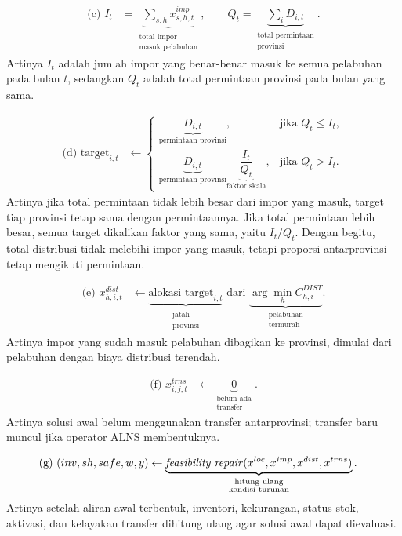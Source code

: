 \documentclass{file/TA-ITS}
\theoremstyle{definition}
\theoremstyle{definition}
\theoremstyle{plain}
\begin{document}
\[
\begin{aligned}
\text{(c) } I_t
&=
\underbrace{\sum_{s,h}x^{imp}_{s,h,t}}_{\substack{\text{total impor}\\\text{masuk pelabuhan}}},
\qquad
Q_t
=
\underbrace{\sum_i D_{i,t}}_{\substack{\text{total permintaan}\\\text{provinsi}}}.
\end{aligned}
\]
\noindent Artinya \(I_t\) adalah jumlah impor yang benar-benar masuk ke semua pelabuhan pada bulan \(t\), sedangkan \(Q_t\) adalah total permintaan provinsi pada bulan yang sama.

\[
\begin{aligned}
\text{(d) } \mathrm{target}_{i,t}
&\leftarrow
\begin{cases}
\underbrace{D_{i,t}}_{\text{permintaan provinsi}},
& \text{jika } Q_t \le I_t,\\[0.55em]
\underbrace{D_{i,t}}_{\text{permintaan provinsi}}
\underbrace{\dfrac{I_t}{Q_t}}_{\text{faktor skala}},
& \text{jika } Q_t > I_t.
\end{cases}
\end{aligned}
\]
\noindent Artinya jika total permintaan tidak lebih besar dari impor yang masuk, target tiap provinsi tetap sama dengan permintaannya. Jika total permintaan lebih besar, semua target dikalikan faktor yang sama, yaitu \(I_t/Q_t\). Dengan begitu, total distribusi tidak melebihi impor yang masuk, tetapi proporsi antarprovinsi tetap mengikuti permintaan.

\[
\begin{aligned}
\text{(e) } x^{dist}_{h,i,t}
&\leftarrow
\underbrace{\text{alokasi } \mathrm{target}_{i,t}}_{\substack{\text{jatah}\\\text{provinsi}}}
\text{ dari }
\underbrace{\arg\min_h C^{DIST}_{h,i}}_{\substack{\text{pelabuhan}\\\text{termurah}}}.
\end{aligned}
\]
\noindent Artinya impor yang sudah masuk pelabuhan dibagikan ke provinsi, dimulai dari pelabuhan dengan biaya distribusi terendah.

\[
\begin{aligned}
\text{(f) } x^{trns}_{i,j,t}
&\leftarrow
\underbrace{0}_{\substack{\text{belum ada}\\\text{transfer}}}.
\end{aligned}
\]
\noindent Artinya solusi awal belum menggunakan transfer antarprovinsi; transfer baru muncul jika operator ALNS membentuknya.

\[
\begin{aligned}
\text{(g) } (inv,sh,safe,w,y)
&\leftarrow
\underbrace{
\text{\textit{feasibility repair}}(x^{loc},x^{imp},x^{dist},x^{trns})
}_{\substack{\text{hitung ulang}\\\text{kondisi turunan}}}.
\end{aligned}
\]
\noindent Artinya setelah aliran awal terbentuk, inventori, kekurangan, status stok, aktivasi, dan kelayakan transfer dihitung ulang agar solusi awal dapat dievaluasi.
\end{document}
